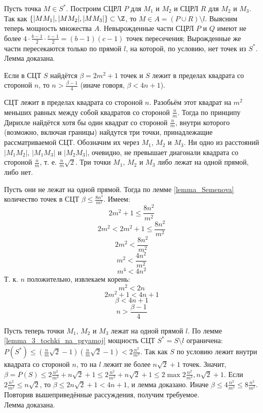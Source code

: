 \dokvo
	Пусть точка $M \in S^*$.
	Построим СЦРЛ $P$ для $M_1$ и $M_2$ и СЦРЛ $R$ для $M_2$ и $M_3$.
	Так как $\{|M M_1|,|M M_2|,|M M_3|\}\subset\Z$, то $M\in A = (P \cup R)\setminus l$.
	Выясним теперь мощность множества $A$.
	Невырожденные части СЦРЛ $P$ и $Q$ имеют не более $4\cdot{\frac{b-1}{2}}\cdot{\frac{c-1}{2}}=(b-1)(c-1)$ точек пересечения;
	Вырожденные же части пересекаются только по прямой $l$, на которой, по условию, нет точек из $S^*$.
\\ Лемма доказана.


\begin{lemma}\label{lemma_ocenka_beta}
	Если в СЦТ $S$ найдётся $\beta = 2m^2 +1$ точек
	и $S$ лежит в пределах квадрата со стороной $n$,
	то $n > \frac{\beta - 1}{4}$ (иначе говоря, $ \beta < 4n + 1$).
\end{lemma}

\dokvo
	СЦТ лежит в пределах квадрата со стороной $n$.
	Разобьём этот квадрат на $m^2$ меньших равных между собой квадратов со стороной $\frac{n}{m}$.
	Тогда по принципу Дирихле найдётся хотя бы один квадрат со стороной $\frac{n}{m}$,
	внутри которого (возможно, включая границы) найдутся три точки, принадлежащие рассматриваемой СЦТ.
	Обозначим их через $M_1$, $M_2$ и $M_3$.
	Ни одно из расстояний $|M_1 M_2|$, $|M_1 M_3|$ и $|M_2 M_3|$, очевидно, не превышает диагонали квадрата со стороной $\frac{n}{m}$,
	т. е. $\frac{n}{m}\sqrt{2}$.
	Три точки $M_1$, $M_2$ и $M_3$ либо лежат на одной прямой, либо нет.

	Пусть они не лежат на одной прямой.
		Тогда по лемме \ref{lemma_Semenova} количество точек в СЦТ $\beta \leq \frac{8n^2}{m^2}$.
		Имеем:
		$$ 2m^2+1 \le \frac{8n^2}{m^2}$$
		$$ 2m^2 < 2m^2+1 \le \frac{8n^2}{m^2}$$
		$$ 2m^2 < \frac{8n^2}{m^2}$$
		$$ m^2 < \frac{4n^2}{m^2}$$
		$$ m^4 < 4n^2$$
		Т. к. $n$ положительно, извлекаем корень:
		$$ m^2 < 2n$$
		$$ 2m^2 +1 < 4n + 1$$
		$$ \beta < 4n + 1$$
		$$n > \frac{\beta - 1}{4}$$

	Пусть теперь точки $M_1$, $M_2$ и $M_3$ лежат на одной прямой $l$.
		По лемме \ref{lemma_3_tochki_na_pryamoj} мощность СЦТ $S^*=S \setminus l$ ограничена:
		$P(S^*) \leq \left( \frac{n}{m}\sqrt{2} - 1 \right)\left( \frac{n}{m}\sqrt{2} - 1 \right) < 2\frac{n^2}{m^2}$.
		Так как $S$ по условию лежит внутри квадрата со стороной $n$, то на $l$ лежит не более $n\sqrt{2} + 1$ точек.
		Значит,
		$\beta = P(S) \leq 2\frac{n^2}{m^2} + n\sqrt{2} + 1 \leq 2\frac{n^2}{m^2} + n\sqrt{2} + 1 \leq 2\max{2\frac{n^2}{m^2}, n\sqrt{2}}+1$.
		Если $2\frac{n^2}{m^2} \leq n\sqrt{2}$, то $\beta \leq 2n\sqrt{2}+1 < 4n+1$,
		и лемма доказано.
		Иначе $\beta \leq 4\frac{n^2}{m^2}  \leq 8\frac{n^2}{m^2}$.
		Повторив вышеприведённые рассуждения, получим требуемое.
\\ Лемма доказана.


